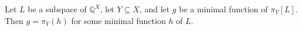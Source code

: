 Let $L$ be a subspace of $\mathbb{Q}^X$, let $Y \subseteq X$, and let $g$ be a minimal function of $\pi_Y[L]$. Then $g = \pi_Y(h)$ for some minimal function $h$ of $L$.
